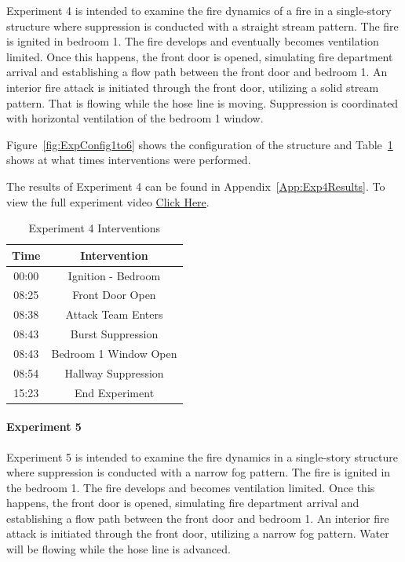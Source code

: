 \documentclass[12pt,oneside]{book}
\begin{document}
Experiment 4 is intended to examine the fire dynamics of a fire in a single-story structure where suppression is conducted with a straight stream pattern. The fire is ignited in bedroom 1. The fire develops and eventually becomes ventilation limited. Once this happens, the front door is opened, simulating fire department arrival and establishing a flow path between the front door and bedroom 1. An interior fire attack is initiated through the front door, utilizing a solid stream pattern. That is flowing while the hose line is moving. Suppression is coordinated with horizontal ventilation of the bedroom 1 window. 

Figure~\ref{fig:ExpConfig1to6} shows the configuration of the structure and Table~\ref{Table:Exp4Interventions} shows at what times interventions were performed. 

The results of Experiment 4 can be found in Appendix~\ref{App:Exp4Results}. To view the full experiment video \href{https://youtu.be/gl8rc1Nsl1k}{Click Here}.

\begin{table}[H]
	\centering
	\caption{Experiment 4 Interventions}
	\begin{tabular}{|c|c|} 
		\hline
		Time & Intervention \\ \hline \hline
		00:00 & Ignition - Bedroom \\ \hline
		08:25 & Front Door Open \\ \hline
		08:38 & Attack Team Enters\\ \hline
		08:43 & Burst Suppression \\ \hline
		08:43 & Bedroom 1 Window Open \\ \hline 
		08:54 & Hallway Suppression \\ \hline
		15:23 & End Experiment\\ \hline
	\end{tabular}
	\label{Table:Exp4Interventions}
\end{table}

\clearpage

\paragraph{Experiment 5} \mbox{}

Experiment 5 is intended to examine the fire dynamics in a single-story structure where suppression is conducted with a narrow fog pattern. The fire is ignited in the bedroom 1. The fire develops and becomes ventilation limited. Once this happens, the front door is opened, simulating fire department arrival and establishing a flow path between the front door and bedroom 1. An interior fire attack is initiated through the front door, utilizing a narrow fog pattern. Water will be flowing while the hose line is advanced.  
\end{document}
